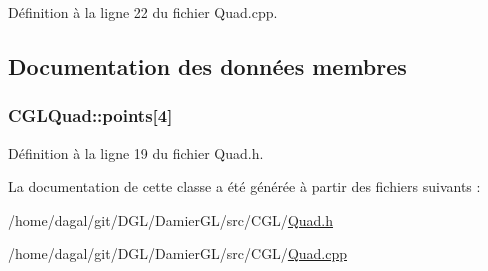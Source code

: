 Définition à la ligne 22 du fichier Quad.\-cpp.



\subsection{Documentation des données membres}
\hypertarget{class_c_g_l_quad_a5851fc58a6ef4dfe0bdb713b0b9c203d}{
\subsubsection[{points}]{ C\-G\-L\-Quad\-::points\mbox{[}4\mbox{]}\hspace{0.3cm}{\ttfamily [protected]}}}\label{class_c_g_l_quad_a5851fc58a6ef4dfe0bdb713b0b9c203d}


Définition à la ligne 19 du fichier Quad.\-h.



La documentation de cette classe a été générée à partir des fichiers suivants \-:\begin{DoxyCompactItemize}
\item 
/home/dagal/git/\-D\-G\-L/\-Damier\-G\-L/src/\-C\-G\-L/\hyperlink{_quad_8h}{Quad.\-h}\item 
/home/dagal/git/\-D\-G\-L/\-Damier\-G\-L/src/\-C\-G\-L/\hyperlink{_quad_8cpp}{Quad.\-cpp}\end{DoxyCompactItemize}
